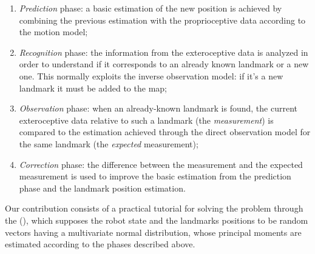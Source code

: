 \begin{enumerate}
	\item \emph{Prediction} phase: a basic estimation of the new position is achieved by combining the previous estimation with the proprioceptive data according to the motion model;
	\item \emph{Recognition} phase: the information from the exteroceptive data is analyzed in order to understand if it corresponds to an already known landmark or a new one. This normally exploits the inverse observation model: if it's a new landmark it must be added to the map;
	\item \emph{Observation} phase: when an already-known landmark is found, the current exteroceptive data relative to such a landmark (the \emph{measurement}) is compared to the estimation achieved through the direct observation model for the same landmark (the \emph{expected} measurement);
	\item \emph{Correction} phase: the difference between the measurement and the expected measurement is used to improve the basic estimation from the prediction phase and the landmark position estimation.
\end{enumerate}

Our contribution consists of a practical tutorial for solving the \SLAM{} problem through the \emph{\Ekf} (\EKF), which supposes the robot state and the landmarks positions to be random vectors having a multivariate normal distribution, whose principal moments are estimated according to the phases described above.

\nocite{brenner204}
\nocite{frischenschlager2013}
\nocite{slamForDummies}
\nocite{sola204}
\nocite{thrun2005}
